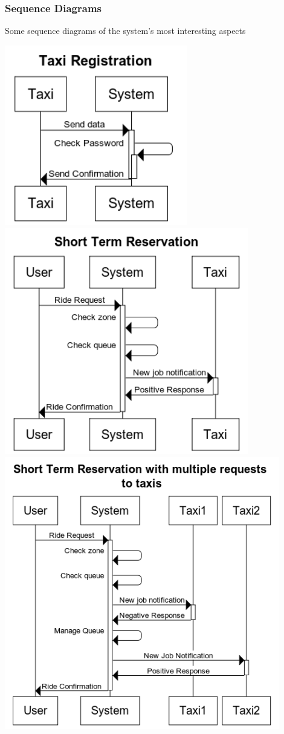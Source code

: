 	\subsubsection{Sequence Diagrams}
	Some sequence diagrams of the system's most interesting aspects
	\begin{center}
		\includegraphics[width=0.60\textwidth]{./images/Taxi_Registration}
		\includegraphics[width=0.80\textwidth]{./images/Short_Term_Reservation}
		\includegraphics[width=0.90\textwidth]{./images/Short_Term_Reservation_with_multiple_requests_to_taxis}

\end{center}
